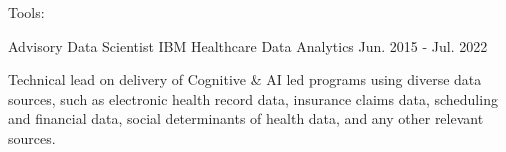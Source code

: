 








\begin{cventries}

  \cvexpentry
    {\posmerative} %
    {\merative} %
    {\orgmerative} %
    {\datmerative} %
    {
      \begin{cvheavyparagraph}
        Tools: \tolmerative
      \end{cvheavyparagraph}
    }
    {
      \begin{cvparagraph}
        \desmerative
      \end{cvparagraph}
      \begin{cvitems}
        \item {\bulamerative}
        \item {\bulbmerative}
      \end{cvitems}
    }

  \cventry
    {Advisory Data Scientist} %
    {IBM} %
    {Healthcare Data Analytics} %
    {Jun. 2015 - Jul. 2022} %
    {
      \begin{cvcompactparagraph}
        Technical lead on delivery of Cognitive \& AI led programs using diverse data sources, such as electronic health record data, insurance claims data, scheduling and financial data, social determinants of health data, and any other relevant sources.
      \end{cvcompactparagraph}
    }


\end{cventries}
